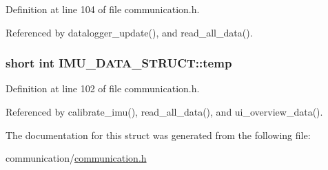 Definition at line 104 of file communication.\-h.



Referenced by datalogger\-\_\-update(), and read\-\_\-all\-\_\-data().

\hypertarget{structIMU__DATA__STRUCT_a81e1dbf765c1d947ca6076aa1bbc73e7}{
\subsubsection[{temp}]{\setlength{\rightskip}{0pt plus 5cm}short int I\-M\-U\-\_\-\-D\-A\-T\-A\-\_\-\-S\-T\-R\-U\-C\-T\-::temp}}\label{structIMU__DATA__STRUCT_a81e1dbf765c1d947ca6076aa1bbc73e7}


Definition at line 102 of file communication.\-h.



Referenced by calibrate\-\_\-imu(), read\-\_\-all\-\_\-data(), and ui\-\_\-overview\-\_\-data().



The documentation for this struct was generated from the following file\-:\begin{DoxyCompactItemize}
\item 
communication/\hyperlink{communication_8h}{communication.\-h}\end{DoxyCompactItemize}
